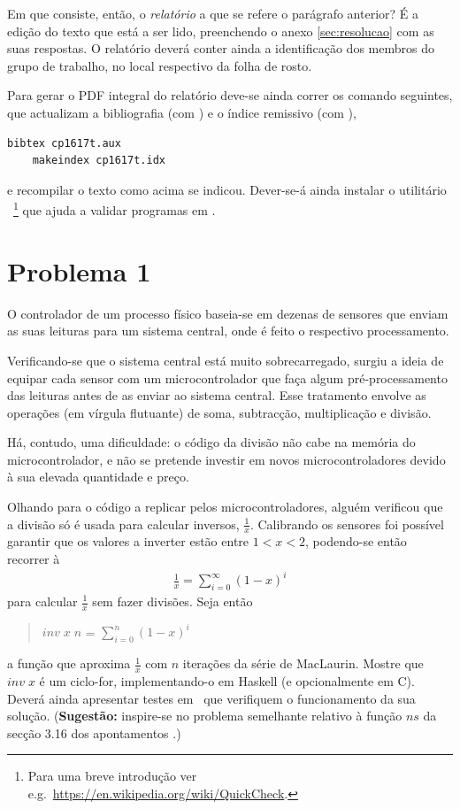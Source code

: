 \documentclass[a4paper]{article}
\newcommand{\Varid}[1]{\mathit{#1}}
\begin{document}
Em que consiste, então, o \emph{relatório} a que se refere o parágrafo anterior?
É a edição do texto que está a ser lido, preenchendo o anexo \ref{sec:resolucao}
com as suas respostas. O relatório deverá conter ainda a identificação dos membros
do grupo de trabalho, no local respectivo da folha de rosto.

Para gerar o PDF integral do relatório deve-se ainda correr os comando seguintes,
que actualizam a bibliografia (com \Bibtex) e o índice remissivo (com \Makeindex),
\begin{Verbatim}[fontsize=\small]
    bibtex cp1617t.aux
    makeindex cp1617t.idx
\end{Verbatim}
e recompilar o texto como acima se indicou. Dever-se-á ainda instalar o utilitário
\QuickCheck\ \footnote{Para uma breve introdução ver
e.g.\ \url{https://en.wikipedia.org/wiki/QuickCheck}.}
que ajuda a validar programas em \Haskell.

\section*{Problema 1}

O controlador de um processo físico baseia-se em dezenas de sensores que enviam
as suas leituras para um sistema central, onde é feito o respectivo processamento.

Verificando-se que o sistema central está muito sobrecarregado, surgiu a
ideia de equipar cada sensor com um microcontrolador que faça algum pré-processamento
das leituras antes de as enviar ao sistema central. Esse tratamento envolve
as operações (em vírgula flutuante) de soma, subtracção, multiplicação e divisão. 

Há, contudo, uma dificuldade: o código da divisão não cabe na memória do
microcontrolador, e não se pretende investir em novos microcontroladores
devido à sua elevada quantidade e preço.

Olhando para o código a replicar pelos microcontroladores, alguém verificou que
a divisão só é usada para calcular inversos, \ensuremath{\frac{\mathrm{1}}{\Varid{x}}}. Calibrando os sensores foi
possível garantir que os valores a inverter estão entre $1 < x <2$,
podendo-se então recorrer à 
\begin{eqnarray*}
\ensuremath{\frac{\mathrm{1}}{\Varid{x}}} = \ensuremath{{\sum}}_{i=0}^\infty (1-x)^i
\end{eqnarray*}
para calcular \ensuremath{\frac{\mathrm{1}}{\Varid{x}}} sem fazer divisões.
Seja então
\begin{quote}
\ensuremath{\Varid{inv}\;\Varid{x}\;\Varid{n}} = $\ensuremath{{\sum}}_{i=0}^n(1-x)^i$
\end{quote}
a função que aproxima \ensuremath{\frac{\mathrm{1}}{\Varid{x}}} com \ensuremath{\Varid{n}} iterações da série de MacLaurin.
Mostre que \ensuremath{\Varid{inv}\;\Varid{x}} é um ciclo-for, implementando-o em Haskell (e opcionalmente em C).
Deverá ainda apresentar testes em \QuickCheck\ que verifiquem o funcionamento
da sua solução. (\textbf{Sugestão:} inspire-se no problema semelhante relativo
à função \ensuremath{\Varid{ns}} da secção 3.16 dos apontamentos \cite{Ol05}.)
\end{document}

